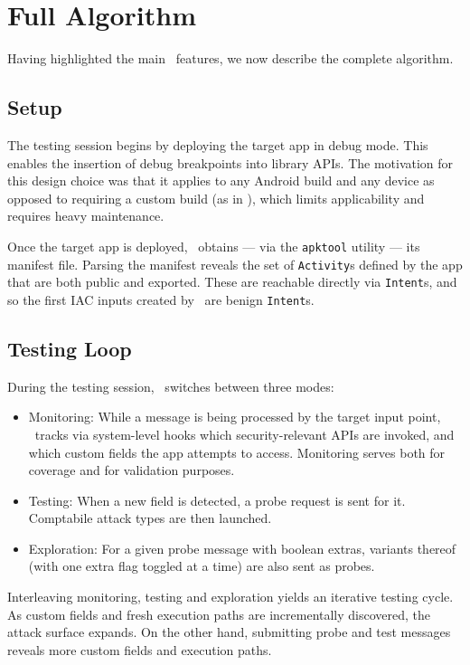 \section{Full Algorithm}\label{Se:fullalg}

Having highlighted the main \Tool\ features, we now describe the complete algorithm.

\subsection{Setup}

The testing session begins by deploying the target app in debug mode. This enables the insertion of debug breakpoints into library APIs. The motivation for this design choice was that it applies to any Android build and any device as opposed to requiring a custom build (as in \cite{EGCCJMS:OSDI10}), which limits applicability and requires heavy maintenance.

Once the target app is deployed, \Tool\ obtains --- via the {\tt apktool} utility --- its manifest file. Parsing the manifest reveals the set of {\tt Activity}s defined by the app that are both public and exported. These are reachable directly via {\tt Intent}s, and so the first IAC inputs created by \Tool\ are benign {\tt Intent}s.

\subsection{Testing Loop}

During the testing session, \Tool\ switches between three modes:
\begin{itemize}
	\item Monitoring: While a message is being processed by the target input point, \Tool\ tracks via system-level hooks which security-relevant APIs are invoked, and which custom fields the app attempts to access. Monitoring serves both for coverage and for validation purposes.
	\item Testing: When a new field is detected, a probe request is sent for it. Comptabile attack types are then launched. 
	\item Exploration: For a given probe message with boolean extras, variants thereof (with one extra flag toggled at a time) are also sent as probes.
\end{itemize}
Interleaving monitoring, testing and exploration yields an iterative testing cycle. As custom fields and fresh execution paths are incrementally discovered, the attack surface expands. On the other hand, submitting probe and test messages reveals more custom fields and execution paths. 

